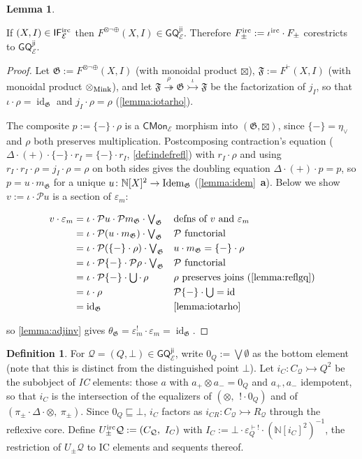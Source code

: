 \documentclass{article}
\makeatletter
\newcommand{\allproofs}{} %
\newif\ifproofsinappendix
\newcommand{\lemmawithproof}[3]{%
  \begin{lemma}\label{#1}
    #2  
    \ifproofsinappendix \hyperref[xxx#1]{(Proof)} \fi
  \end{lemma}
    \ifproofsinappendix
  \g@addto@macro\allproofs{%
    \par\medskip
    \noindent
    \subsection*{\cref{#1}}\par
    #2\par
    \begin{proof}\label{xxx#1}
      #3
    \end{proof}%
  }
      \else

    \begin{proof}
      #3
    \end{proof}
    \fi 
}
\theoremstyle{definition}
\newtheorem{definition}{Definition}[section]
\newtheorem{lemma}{Lemma}[section]
\newcommand{\N}{\mathbb{N}}
\newcommand{\F}{\mathfrak{F}}
\newcommand{\G}{\mathfrak{G}}
\newcommand{\cE}{\mathcal{E}}
\newcommand{\cP}{\mathcal{P}}
\newcommand{\cQ}{\mathcal{Q}}
\newcommand{\cat}[1]{\mathsf{#1}}
\newcommand{\id}{\operatorname{id}}
\makeatother
\begin{document}
\lemmawithproof{lemma:jicorestrict}{
If $(X,I)\in\cat{IF^{\rm irc}_\cE}$ then $F^{\otimes\neg\oplus}(X,I)\in\cat{GQ^{ji}_\cE}$. Therefore $F^{\rm irc}_\pm:=\iota^{\rm irc}\cdot F_\pm$ corestricts to $\cat{GQ^{ji}_\cE}$.
}{
Let $\G:=F^{\otimes\neg\oplus}(X,I)$ (with monoidal product $\boxtimes$), $\F:=F^\vdash(X,I)$ (with monoidal product $\otimes_{\rm Mink}$), and let $\F\overset{\rho}{\twoheadrightarrow}\G\overset{\iota}{\rightarrowtail}\F$ be the factorization of $j_I$, so that $\iota\cdot\rho=\id_\G$ and $j_I\cdot\rho=\rho$ (\cref{lemma:iotarho}).


The composite $p:=\{-\}\cdot\rho$ is a $\cat{CMon}_\cE$ morphism into $(\G,\boxtimes)$, since $\{-\}=\eta_\vee$ and $\rho$ both preserves multiplication. 
Postcomposing contraction's equation ($\Delta\cdot(+)\cdot\{-\}\cdot r_I = \{-\}\cdot r_I$, \cref{def:indefrefl}) with $r_I\cdot\rho$ and using $r_I\cdot r_I\cdot\rho=j_I\cdot\rho=\rho$ on both sides gives the doubling equation $\Delta\cdot(+)\cdot p=p$, so $p=u\cdot m_\G$ for a unique $u\colon\N[X]^2\to{\rm Idem}_\G$ (\cref{lemma:idem}~{\bf a}).
Below we show $v:=\iota\cdot\cP u$ is a section of $\varepsilon_m$:

\begin{align*}
v\cdot\varepsilon_m
&= \iota\cdot\cP u\cdot\cP m_\G\cdot\textstyle\bigvee_\G
  && \text{defns of }v\text{ and }\varepsilon_m\\
&= \iota\cdot\cP(u\cdot m_\G)\cdot\textstyle\bigvee_\G
  && \cP\text{ functorial}\\
&= \iota\cdot\cP(\{-\}\cdot\rho)\cdot\textstyle\bigvee_\G
  && u\cdot m_\G=\{-\}\cdot\rho\\
&= \iota\cdot\cP\{-\}\cdot\cP\rho\cdot\textstyle\bigvee_\G
  && \cP\text{ functorial}\\
&= \iota\cdot\cP\{-\}\cdot\textstyle\bigcup\cdot\,\rho
  && \rho\text{ preserves joins (\cref{lemma:reflgq})}\\
&= \iota\cdot\rho
  && \cP\{-\}\cdot\textstyle\bigcup=\id\\
&= \id_\G
  && \text{\cref{lemma:iotarho}}
\end{align*}

so \cref{lemma:adjinv} gives $\theta_\G=\varepsilon_m^!\cdot\varepsilon_m=\id_\G$.
}


\begin{definition}\label{def:iccore}
For $\cQ=(Q,\bot)\in\cat{GQ^{ji}_\cE}$, write $0_Q:=\bigvee\emptyset$ as the bottom element (note that this is distinct from the distinguished point $\bot$).
Let $i_C\colon C_\cQ\rightarrowtail Q^2$ be the subobject of \emph{IC} elements: those $a$ with $a_+\otimes a_-=0_Q$ and $a_+,a_-$ idempotent, so that $i_C$ is the intersection of the equalizers of $(\otimes,\ \,!\cdot 0_Q)$ and of $(\pi_\pm\cdot\Delta\cdot\otimes,\ \pi_\pm)$.
Since $0_Q\sqsubseteq\bot$, $i_C$ factors as $i_{CR}\colon C_\cQ\rightarrowtail R_\cQ$ through the reflexive core. 
Define $U^{\rm irc}_\pm\cQ:=(C_\cQ,\ I_C)$ with $I_C:=\bot\cdot\varepsilon^{\vdash!}_Q\cdot(\N[i_C]^2)^{-1}$, the restriction of $U_\pm\cQ$ to IC elements and sequents thereof. 
\end{definition}
\end{document}
